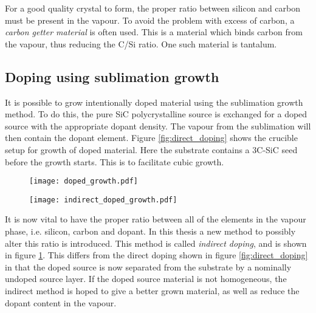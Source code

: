 For a good quality crystal to form, the proper ratio between silicon and carbon must be present in the vapour. To avoid the problem with excess of carbon, a \emph{carbon getter material} is often used. This is a material which binds carbon from the vapour, thus reducing the C/Si ratio. One such material is tantalum. 

\subsection{Doping using sublimation growth}
\label{sec:growth:fsgp:doping}
It is possible to grow intentionally doped material using the sublimation growth method. To do this, the pure SiC polycrystalline source is exchanged for a doped source with the appropriate dopant density. The vapour from the sublimation will then contain the dopant element. Figure \ref{fig:direct_doping} shows the crucible setup for growth of doped material. Here the substrate contains a 3C-SiC seed before the growth starts. This is to facilitate cubic growth. 

\begin{figure}[h]
\centering
\begin{minipage}{.5\textwidth}
  \centering
  \texttt{[image: doped\_growth.pdf]}
  \label{fig:direct_doping}
\end{minipage}%
\begin{minipage}{.5\textwidth}
  \centering
  \texttt{[image: indirect\_doped\_growth.pdf]}
  \label{fig:indirect_doping}
\end{minipage}
\end{figure}

It is now vital to have the proper ratio between all of the elements in the vapour phase, i.e. silicon, carbon and dopant. In this thesis a new method to possibly alter this ratio is introduced. This method is called \emph{indirect doping}, and is shown in figure \ref{fig:indirect_doping}. This differs from the direct doping shown in figure \ref{fig:direct_doping} in that the doped source is now separated from the substrate by a nominally undoped source layer. If the doped source material is not homogeneous, the indirect method is hoped to give a better grown material, as well as reduce the dopant content in the vapour. 

